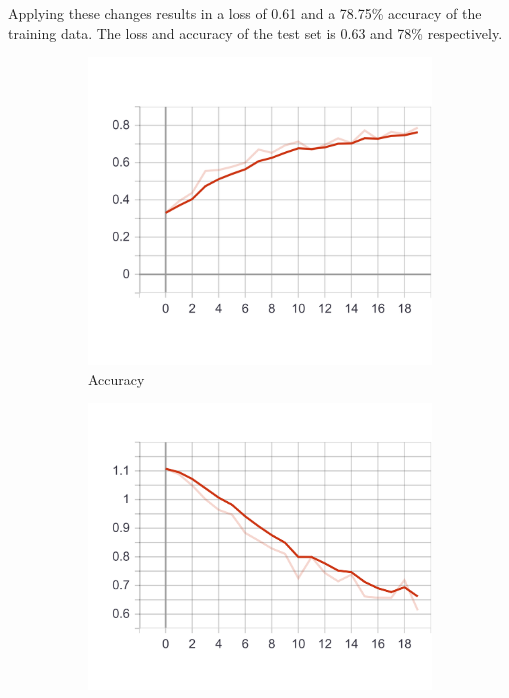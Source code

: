 Applying these changes results in a loss of 0.61 and a 78.75\% accuracy of the training data.
The loss and accuracy of the test set is 0.63 and 78\% respectively.

\begin{figure}
    \centering
    \begin{subfigure}[b]{0.4\textwidth}
        \includegraphics[width=\textwidth]{images/first_model_data_augmentation_acc.png}
        \caption{Accuracy}
        \label{fig:first_model_data_augmentation_acc}
    \end{subfigure}
    \begin{subfigure}[b]{0.4\textwidth}
        \includegraphics[width=\textwidth]{images/first_model_data_augmentation_loss.png}

\end{subfigure}
\end{figure}
